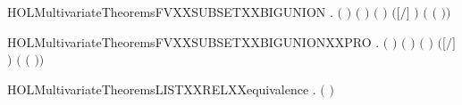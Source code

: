 \newcommand{\HOLMultivariateTheoremsfromListXXHD}{\UseVerbatim{HOLMultivariateTheoremsfromListXXHD}}
\begin{SaveVerbatim}{HOLMultivariateTheoremsFVXXSUBSETXXBIGUNION}
\HOLTokenTurnstile{} \HOLSymConst{\HOLTokenForall{}}  .
         \HOLSymConst{\HOLTokenConj{}} \ensuremath{(}  \HOLSymConst{\ensuremath{=}}  \ensuremath{)} \HOLSymConst{\HOLTokenConj{}}
        \ensuremath{(} \ensuremath{)} \ensuremath{(} \ensuremath{)} \HOLSymConst{\HOLTokenImp{}}
        \ensuremath{(}\ensuremath{[}\ensuremath{/}\ensuremath{]} \ensuremath{)} \HOLConst{\HOLTokenSubset{}}   \HOLConst{\HOLTokenUnion{}}  \ensuremath{(}  \ensuremath{(} \ensuremath{)}\ensuremath{)}
\end{SaveVerbatim}
\newcommand{\HOLMultivariateTheoremsFVXXSUBSETXXBIGUNION}{\UseVerbatim{HOLMultivariateTheoremsFVXXSUBSETXXBIGUNION}}
\begin{SaveVerbatim}{HOLMultivariateTheoremsFVXXSUBSETXXBIGUNIONXXPRO}
\HOLTokenTurnstile{} \HOLSymConst{\HOLTokenForall{}}  .
         \HOLSymConst{\HOLTokenConj{}} \ensuremath{(}  \HOLSymConst{\ensuremath{=}}  \ensuremath{)} \HOLSymConst{\HOLTokenConj{}}
        \ensuremath{(} \ensuremath{)} \ensuremath{(} \ensuremath{)} \HOLSymConst{\HOLTokenImp{}}
        \ensuremath{(}\ensuremath{[}\ensuremath{/}\ensuremath{]} \ensuremath{)} \HOLConst{\HOLTokenSubset{}}
            \HOLConst{\HOLTokenUnion{}}  \ensuremath{(}  \ensuremath{(} \ensuremath{)}\ensuremath{)}
\end{SaveVerbatim}
\newcommand{\HOLMultivariateTheoremsFVXXSUBSETXXBIGUNIONXXPRO}{\UseVerbatim{HOLMultivariateTheoremsFVXXSUBSETXXBIGUNIONXXPRO}}
\begin{SaveVerbatim}{HOLMultivariateTheoremsLISTXXRELXXequivalence}
\HOLTokenTurnstile{} \HOLSymConst{\HOLTokenForall{}}.   \HOLSymConst{\HOLTokenImp{}}  \ensuremath{(} \ensuremath{)}
\end{SaveVerbatim}

